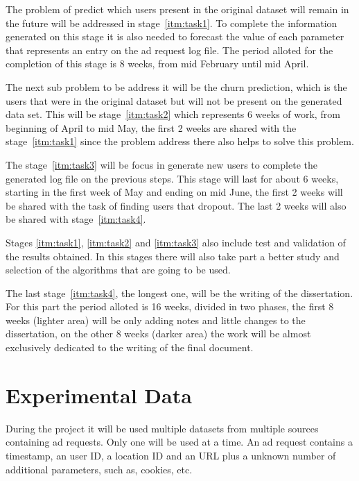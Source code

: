 The problem of predict which users present in the original dataset will remain
in the future will be addressed in stage~\ref{itm:task1}. To complete the
information generated on this stage it is also needed to forecast the value of
each parameter that represents an entry on the ad request log file. The period
alloted for the completion of this stage is 8 weeks, from mid February until mid
April.

The next sub problem to be address it will be the churn prediction, which is the
users that were in the original dataset but will not be present on the generated
data set. This will be stage~\ref{itm:task2} which represents 6 weeks of
work, from beginning of April to mid May,
the first 2 weeks are shared with the stage~\ref{itm:task1} since the problem
address there also helps to solve this problem.

The stage~\ref{itm:task3} will be focus in generate new users to complete the
generated log file on the previous steps. This stage will last for about 6
weeks, starting in the first week of May and ending on mid June, the first 2
weeks will be shared with the task of finding users that dropout. The last 2
weeks will also be shared with stage~\ref{itm:task4}.

Stages \ref{itm:task1}, \ref{itm:task2} and \ref{itm:task3} also include test
and validation of the results obtained. In this stages there will also take part
a better study and selection of the algorithms that are going to be used.

The last stage~\ref{itm:task4}, the longest one, will be the writing of the
dissertation. For this part the period alloted is 16 weeks, divided in two
phases, the first 8 weeks (lighter area) will be only adding notes and little changes to the
dissertation, on the other 8 weeks (darker area) the work will be almost exclusively dedicated
to the writing of the final document.




\section{Experimental Data}

During the project it will be used multiple datasets from multiple sources containing ad requests. 
Only one will be used at a time. 
An ad request contains a timestamp, an user ID, a location ID and an URL plus a unknown number of
additional parameters, such as, cookies, etc.

